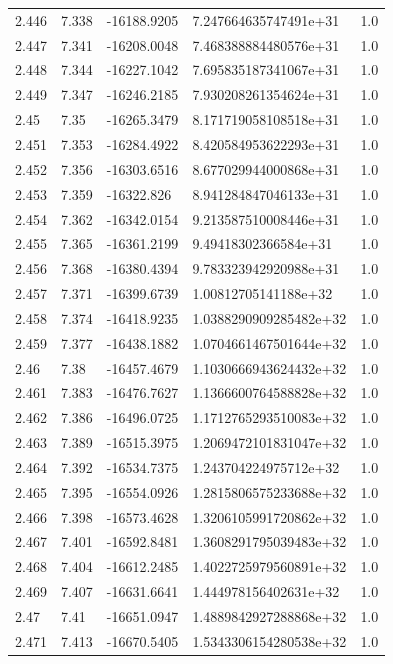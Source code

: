 \begin{tabular}{lllll}
2.446 & 7.338 & -16188.9205 & 7.247664635747491e+31 & 1.0 \\
2.447 & 7.341 & -16208.0048 & 7.468388884480576e+31 & 1.0 \\
2.448 & 7.344 & -16227.1042 & 7.695835187341067e+31 & 1.0 \\
2.449 & 7.347 & -16246.2185 & 7.930208261354624e+31 & 1.0 \\
2.45 & 7.35 & -16265.3479 & 8.171719058108518e+31 & 1.0 \\
2.451 & 7.353 & -16284.4922 & 8.420584953622293e+31 & 1.0 \\
2.452 & 7.356 & -16303.6516 & 8.677029944000868e+31 & 1.0 \\
2.453 & 7.359 & -16322.826 & 8.941284847046133e+31 & 1.0 \\
2.454 & 7.362 & -16342.0154 & 9.213587510008446e+31 & 1.0 \\
2.455 & 7.365 & -16361.2199 & 9.49418302366584e+31 & 1.0 \\
2.456 & 7.368 & -16380.4394 & 9.783323942920988e+31 & 1.0 \\
2.457 & 7.371 & -16399.6739 & 1.00812705141188e+32 & 1.0 \\
2.458 & 7.374 & -16418.9235 & 1.0388290909285482e+32 & 1.0 \\
2.459 & 7.377 & -16438.1882 & 1.0704661467501644e+32 & 1.0 \\
2.46 & 7.38 & -16457.4679 & 1.1030666943624432e+32 & 1.0 \\
2.461 & 7.383 & -16476.7627 & 1.1366600764588828e+32 & 1.0 \\
2.462 & 7.386 & -16496.0725 & 1.1712765293510083e+32 & 1.0 \\
2.463 & 7.389 & -16515.3975 & 1.2069472101831047e+32 & 1.0 \\
2.464 & 7.392 & -16534.7375 & 1.243704224975712e+32 & 1.0 \\
2.465 & 7.395 & -16554.0926 & 1.2815806575233688e+32 & 1.0 \\
2.466 & 7.398 & -16573.4628 & 1.3206105991720862e+32 & 1.0 \\
2.467 & 7.401 & -16592.8481 & 1.3608291795039483e+32 & 1.0 \\
2.468 & 7.404 & -16612.2485 & 1.4022725979560891e+32 & 1.0 \\
2.469 & 7.407 & -16631.6641 & 1.444978156402631e+32 & 1.0 \\
2.47 & 7.41 & -16651.0947 & 1.4889842927288868e+32 & 1.0 \\
2.471 & 7.413 & -16670.5405 & 1.5343306154280538e+32 & 1.0 \\

\end{tabular}
